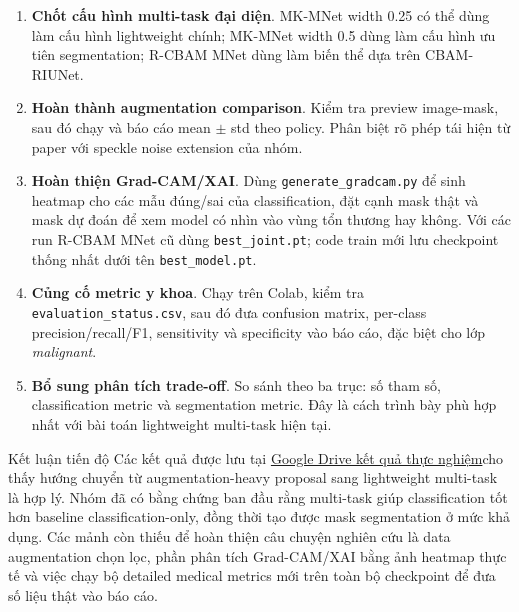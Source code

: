 \documentclass[12pt,a4paper]{article}
\newcommand{\resultdrive}{\href{https://drive.google.com/drive/folders/1ZFqnT5X12mwOahLquEp8JkauidLAaHGb}{Google Drive kết quả thực nghiệm}}
\begin{document}
\begin{enumerate}[label=\textbf{G\arabic*.}]
    \item \textbf{Chốt cấu hình multi-task đại diện}. MK-MNet width 0.25 có thể dùng làm cấu hình lightweight chính; MK-MNet width 0.5 dùng làm cấu hình ưu tiên segmentation; R-CBAM MNet dùng làm biến thể dựa trên CBAM-RIUNet.
    \item \textbf{Hoàn thành augmentation comparison}. Kiểm tra preview image-mask, sau đó chạy  và báo cáo mean \(\pm\) std theo policy. Phân biệt rõ phép tái hiện từ paper với speckle noise extension của nhóm.
    \item \textbf{Hoàn thiện Grad-CAM/XAI}. Dùng \texttt{generate\_gradcam.py} để sinh heatmap cho các mẫu đúng/sai của classification, đặt cạnh mask thật và mask dự đoán để xem model có nhìn vào vùng tổn thương hay không. Với các run R-CBAM MNet cũ dùng \texttt{best\_joint.pt}; code train mới lưu checkpoint thống nhất dưới tên \texttt{best\_model.pt}.
    \item \textbf{Củng cố metric y khoa}. Chạy  trên Colab, kiểm tra \texttt{evaluation\_status.csv}, sau đó đưa confusion matrix, per-class precision/recall/F1, sensitivity và specificity vào báo cáo, đặc biệt cho lớp \textit{malignant}.
    \item \textbf{Bổ sung phân tích trade-off}. So sánh theo ba trục: số tham số, classification metric và segmentation metric. Đây là cách trình bày phù hợp nhất với bài toán lightweight multi-task hiện tại.
\end{enumerate}

\begin{methodbox}{Kết luận tiến độ}
Các kết quả được lưu tại \resultdrive cho thấy hướng chuyển từ augmentation-heavy proposal sang lightweight multi-task là hợp lý. Nhóm đã có bằng chứng ban đầu rằng multi-task giúp classification tốt hơn baseline classification-only, đồng thời tạo được mask segmentation ở mức khả dụng. Các mảnh còn thiếu để hoàn thiện câu chuyện nghiên cứu là data augmentation chọn lọc, phần phân tích Grad-CAM/XAI bằng ảnh heatmap thực tế và việc chạy bộ detailed medical metrics mới trên toàn bộ checkpoint để đưa số liệu thật vào báo cáo.
\end{methodbox}

\end{document}
